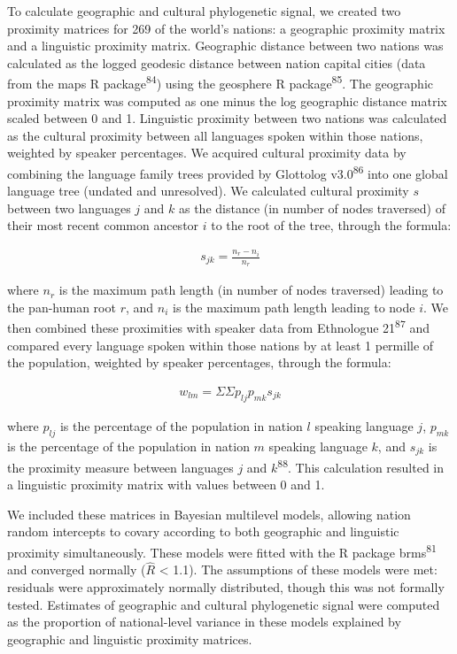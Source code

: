 \documentclass[
  man,floatsintext]{apa6}
\begin{document}
To calculate geographic and cultural phylogenetic signal, we created two proximity matrices for 269 of the world's nations: a geographic proximity matrix and a linguistic proximity matrix. Geographic distance between two nations was calculated as the logged geodesic distance between nation capital cities (data from the maps R package\textsuperscript{84}) using the geosphere R package\textsuperscript{85}. The geographic proximity matrix was computed as one minus the log geographic distance matrix scaled between 0 and 1. Linguistic proximity between two nations was calculated as the cultural proximity between all languages spoken within those nations, weighted by speaker percentages. We acquired cultural proximity data by combining the language family trees provided by Glottolog v3.0\textsuperscript{86} into one global language tree (undated and unresolved). We calculated cultural proximity \(s\) between two languages \(j\) and \(k\) as the distance (in number of nodes traversed) of their most recent common ancestor \(i\) to the root of the tree, through the formula:

\begin{gather}
s_{jk} = \frac{n_{r}-n_{i}}{n_{r}}
\end{gather}

where \(n_{r}\) is the maximum path length (in number of nodes traversed) leading to the pan-human root \(r\), and \(n_{i}\) is the maximum path length leading to node \(i\). We then combined these proximities with speaker data from Ethnologue 21\textsuperscript{87} and compared every language spoken within those nations by at least 1 permille of the population, weighted by speaker percentages, through the formula:

\begin{gather}
w_{lm} = {\Sigma}{\Sigma}p_{lj}p_{mk}s_{jk}
\end{gather}

where \(p_{lj}\) is the percentage of the population in nation \(l\) speaking language \(j\), \(p_{mk}\) is the percentage of the population in nation \(m\) speaking language \(k\), and \(s_{jk}\) is the proximity measure between languages \(j\) and \(k\)\textsuperscript{88}. This calculation resulted in a linguistic proximity matrix with values between 0 and 1.

We included these matrices in Bayesian multilevel models, allowing nation random intercepts to covary according to both geographic and linguistic proximity simultaneously. These models were fitted with the R package brms\textsuperscript{81} and converged normally (\(\hat{R}\) \textless{} 1.1). The assumptions of these models were met: residuals were approximately normally distributed, though this was not formally tested. Estimates of geographic and cultural phylogenetic signal were computed as the proportion of national-level variance in these models explained by geographic and linguistic proximity matrices.
\end{document}

